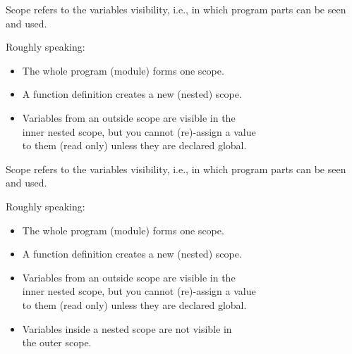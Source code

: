 \documentclass[aspectratio=1610,slidestop]{beamer}
\begin{document}
\begin{pframe}
 \addtocounter{framenumber}{-1}
 Scope refers to the variables visibility, i.e., in which program parts can be seen and used.
 \medskip

  Roughly speaking:
  \begin{itemize}
   \item The whole program (module) forms one scope.
   \item A function definition creates a new (nested) scope.
   \item Variables from an outside scope are visible in the \\
         inner nested scope, but you cannot (re)-assign a value\\
         to them (read only) unless they are declared global.
 \end{itemize}
\end{pframe}


\begin{pframe}
 \addtocounter{framenumber}{-1}
 Scope refers to the variables visibility, i.e., in which program parts can be seen and used.
 \medskip

  Roughly speaking:
  \begin{itemize}
   \item The whole program (module) forms one scope.
   \item A function definition creates a new (nested) scope.
   \item Variables from an outside scope are visible in the \\
         inner nested scope, but you cannot (re)-assign a value\\
         to them (read only) unless they are declared global.
   \item Variables inside a nested scope are not visible in \\
         the outer scope.
 \end{itemize}
\end{pframe}
\end{document}

